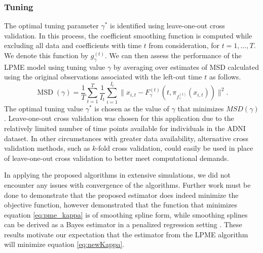 \documentclass[12pt]{article}
\theoremstyle{definition}
\begin{document}
\subsubsection{Tuning}

The optimal tuning parameter $\gamma^*$ is identified using leave-one-out cross validation. In this process, the coefficient smoothing function is computed while excluding all data and coefficients with time $t$ from consideration, for $t = 1, \dots, T$. We denote this function by $g_{\gamma}^{(t)}$. We can then assess the performance of the LPME model using tuning value $\gamma$ by averaging over estimates of MSD calculated using the original observations associated with the left-out time $t$ as follows.
\begin{equation}
  \operatorname{MSD}(\gamma) = \frac{1}{T} \sum_{t=1}^{T}\frac{1}{I_t}\sum_{i=1}^{I_t}\|x_{i, t} - F_{\gamma}^{(t)}(t, \pi_{f_{\gamma}^{(t)}}(x_{i, t}))\|^2. \label{eq:18}
\end{equation}
The optimal tuning value $\gamma^*$ is chosen as the value of $\gamma$ that minimizes $MSD(\gamma)$. Leave-one-out cross validation was chosen for this application due to the relatively limited number of time points available for individuals in the ADNI dataset. In other circumstances with greater data availability, alternative cross validation methods, such as $k$-fold cross validation, could easily be used in place of leave-one-out cross validation to better meet computational demands.

In applying the proposed algorithms in extensive simulations, we did not encounter any issues with convergence of the algorithms. Further work must be done to demonstrate that the proposed estimator does indeed minimize the objective function, however \cite{meng2021Principal} demonstrated that the function that minimizes equation \eqref{eq:pme_kappa} is of smoothing spline form, while smoothing splines can be derived as a Bayes estimator in a penalized regression setting \citep{wahba1990}. These results motivate our expectation that the estimator from the LPME algorithm will minimize equation \eqref{eq:newKappa}.



\LinesNumbered


\LinesNumbered
\end{document}
